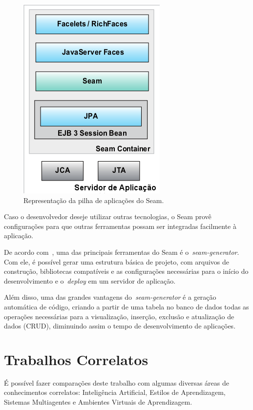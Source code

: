 \begin{figure}
	\centering
	\includegraphics[scale=0.65]{images/servidor-app-seam.png}
	\caption{Representação da pilha de aplicações do Seam.~\cite{allen09}}
	\label{fig:servidor-app-seam}
\end{figure}

Caso o desenvolvedor deseje utilizar outras tecnologias, o Seam provê configurações para que outras ferramentas possam ser integradas facilmente à aplicação.

De acordo com~\cite{allen09}, uma das principais ferramentas do Seam é o~\emph{seam-generator}. Com ele, é possível gerar uma estrutura básica de projeto, com arquivos de construção, bibliotecas compatíveis e as configurações necessárias para o início do desenvolvimento e o~\emph{deploy} em um servidor de aplicação.

Além disso, uma das grandes vantagens do~\emph{seam-generator} é a geração automática de código, criando a partir de uma tabela no banco de dados todas as operações necessárias para a visualização, inserção, exclusão e atualização de dados (CRUD), diminuindo assim o tempo de desenvolvimento de aplicações.

\section{Trabalhos Correlatos}
É possível fazer comparações deste trabalho com algumas diversas áreas de conhecimentos correlatos: Inteligência Artificial, Estilos de Aprendizagem, Sistemas Multiagentes e Ambientes Virtuais de Aprendizagem.

